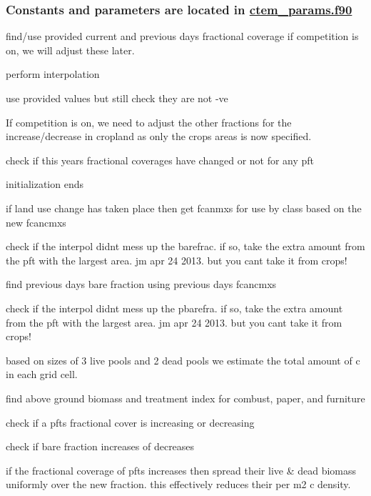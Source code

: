  \subsubsection*{Constants and parameters are located in \hyperlink{ctem__params_8f90}{ctem\+\_\+params.\+f90} }





find/use provided current and previous day\textquotesingle{}s fractional coverage if competition is on, we will adjust these later.

perform interpolation

use provided values but still check they are not -\/ve

If competition is on, we need to adjust the other fractions for the increase/decrease in cropland as only the crops areas is now specified.

check if this year\textquotesingle{}s fractional coverages have changed or not for any pft

initialization ends 



if land use change has taken place then get fcanmxs for use by class based on the new fcancmxs

check if the interpol didn\textquotesingle{}t mess up the barefrac. if so, take the extra amount from the pft with the largest area. jm apr 24 2013. but you can\textquotesingle{}t take it from crops!

find previous day\textquotesingle{}s bare fraction using previous day\textquotesingle{}s fcancmxs

check if the interpol didn\textquotesingle{}t mess up the pbarefra. if so, take the extra amount from the pft with the largest area. jm apr 24 2013. but you can\textquotesingle{}t take it from crops!

based on sizes of 3 live pools and 2 dead pools we estimate the total amount of c in each grid cell.

\begin{DoxyVerb}find above ground biomass and treatment index for combust, paper,
and furniture \end{DoxyVerb}


check if a pft\textquotesingle{}s fractional cover is increasing or decreasing

check if bare fraction increases of decreases

if the fractional coverage of pfts increases then spread their live \& dead biomass uniformly over the new fraction. this effectively reduces their per m2 c density.

